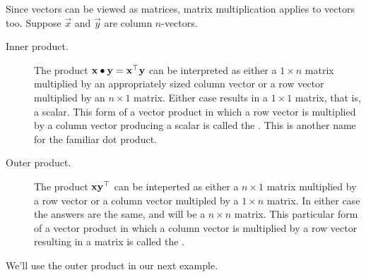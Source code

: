 \documentclass{ximera}
\begin{document}
Since vectors can be viewed as matrices, matrix multiplication applies
to vectors too. Suppose $\vec{x}$ and $\vec y$ are column $n$-vectors.
\begin{description}
\item[Inner product.] The product $\mathbf{x}\bullet\mathbf{y} =
  \mathbf{x}^\top \mathbf{y}$ can be interpreted as either a $1 \times
  n$ matrix multiplied by an appropriately sized column vector or a
  row vector multiplied by an $n \times 1$ matrix. Either case results
  in a $1 \times 1$ matrix, that is, a scalar. This form of a vector
  product in which a row vector is multiplied by a column vector
  producing a scalar is called the . This is
  another name for the familiar dot product.
\item[Outer product.] The product $\mathbf{x} \mathbf{y}^\top$ can be
  inteperted as either a $n\times 1$ matrix multiplied by a row vector or a
  column vector multipled by a $1\times n$ matrix. In either case the
  answers are the same, and will be a $n\times n$ matrix. This particular
  form of a vector product in which a column vector is multiplied by a
  row vector resulting in a matrix is called the .
\end{description}



We'll use the outer product in our next example.
\end{document}
